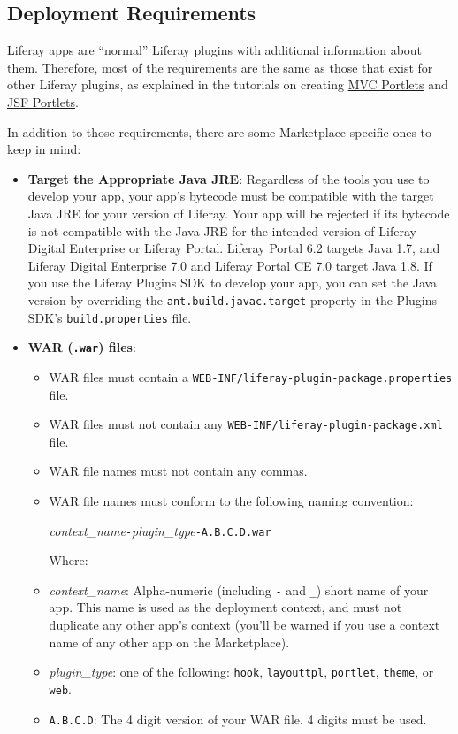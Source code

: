 \subsection{Deployment Requirements}\label{deployment-requirements}

Liferay apps are ``normal'' Liferay plugins with additional information
about them. Therefore, most of the requirements are the same as those
that exist for other Liferay plugins, as explained in the tutorials on
creating
\href{/docs/7-0/tutorials/-/knowledge_base/t/liferay-mvc-portlet}{MVC
Portlets} and
\href{/docs/7-0/tutorials/-/knowledge_base/t/jsf-portlets-with-liferay-faces}{JSF
Portlets}.

In addition to those requirements, there are some Marketplace-specific
ones to keep in mind:

\begin{itemize}
\item
  \textbf{Target the Appropriate Java JRE}: Regardless of the tools you
  use to develop your app, your app's bytecode must be compatible with
  the target Java JRE for your version of Liferay. Your app will be
  rejected if its bytecode is not compatible with the Java JRE for the
  intended version of Liferay Digital Enterprise or Liferay Portal.
  Liferay Portal 6.2 targets Java 1.7, and Liferay Digital Enterprise
  7.0 and Liferay Portal CE 7.0 target Java 1.8. If you use the Liferay
  Plugins SDK to develop your app, you can set the Java version by
  overriding the \texttt{ant.build.javac.target} property in the Plugins
  SDK's \texttt{build.properties} file.
\item
  \textbf{WAR (\texttt{.war}) files}:

  \begin{itemize}
  \item
    WAR files must contain a
    \texttt{WEB-INF/liferay-plugin-package.properties} file.
  \item
    WAR files must not contain any
    \texttt{WEB-INF/liferay-plugin-package.xml} file.
  \item
    WAR file names must not contain any commas.
  \item
    WAR file names must conform to the following naming convention:

    \emph{context\_name}\texttt{-}\emph{plugin\_type}\texttt{-A.B.C.D.war}

    Where:
  \item
    \emph{context\_name}: Alpha-numeric (including \texttt{-} and
    \texttt{\_}) short name of your app. This name is used as the
    deployment context, and must not duplicate any other app's context
    (you'll be warned if you use a context name of any other app on the
    Marketplace).
  \item
    \emph{plugin\_type}: one of the following: \texttt{hook},
    \texttt{layouttpl}, \texttt{portlet}, \texttt{theme}, or
    \texttt{web}.
  \item
    \texttt{A.B.C.D}: The 4 digit version of your WAR file. 4 digits
    must be used.


\end{itemize}
\end{itemize}

